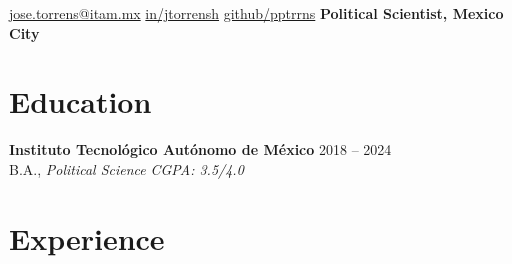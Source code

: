 \documentclass[letter]{resume}
\begin{document}

\begin{center}
\normalsize
{}
{\href{mailto://jose.torrens@itam.mx}{jose.torrens@itam.mx}}
{\href{https://www.linkedin.com/in/jtorrensh/}{in/jtorrensh}}
{\href{https://github.com/pptrrns}{github/pptrrns}}
\bfseries{Political Scientist, Mexico City}

\end{center}



\section{Education}

\begin{content}

{\bf Instituto Tecnológico Autónomo de México} \hfill{2018 -- 2024}\\ 
{B.A., \emph{Political Science}} \hfill \emph{CGPA: 3.5/4.0}

\sectionlineskip
\end{content}


\section{Experience}
\end{document}
